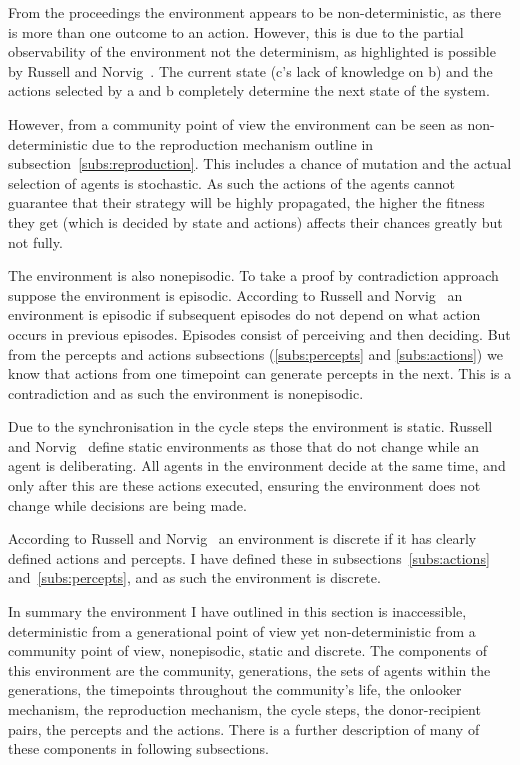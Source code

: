 \documentclass[]{final_report}
\begin{document}
From the proceedings the environment appears to be non-deterministic, as there is more than one outcome to an action. However, this is due to the partial observability of the environment not the determinism, as highlighted is possible by Russell and Norvig~\cite{russell2016artificial}. The current state (c's lack of knowledge on b) and the actions selected by a and b completely determine the next state of the system.\par
However, from a community point of view the environment can be seen as non-deterministic due to the reproduction mechanism outline in subsection~\ref{subs:reproduction}. This includes a chance of mutation and the actual selection of agents is stochastic. As such the actions of the agents cannot guarantee that their strategy will be highly propagated, the higher the fitness they get (which is decided by state and actions) affects their chances greatly but not fully.\par
The environment is also nonepisodic. To take a proof by contradiction approach suppose the environment is episodic. According to Russell and Norvig~\cite{russell2016artificial} an environment is episodic if subsequent episodes do not depend on what action occurs in previous episodes. Episodes consist of perceiving and then deciding. But from the percepts and actions subsections (\ref{subs:percepts} and \ref{subs:actions}) we know that actions from one timepoint can generate percepts in the next. This is a contradiction and as such the environment is nonepisodic.\par
Due to the synchronisation in the cycle steps the environment is static. Russell and Norvig~\cite{russell2016artificial} define static environments as those that do not change while an agent is deliberating. All agents in the environment decide at the same time, and only after this are these actions executed, ensuring the environment does not change while decisions are being made.\par
According to Russell and Norvig~\cite{russell2016artificial} an environment is discrete if it has clearly defined actions and percepts. I have defined these in subsections~\ref{subs:actions} and~\ref{subs:percepts}, and as such the environment is discrete.\par
In summary the environment I have outlined in this section is inaccessible, deterministic from a generational point of view yet non-deterministic from a community point of view, nonepisodic, static and discrete. The components of this environment are the community, generations, the sets of agents within the generations, the timepoints throughout the community's life, the onlooker mechanism, the reproduction mechanism, the cycle steps, the donor-recipient pairs, the percepts and the actions. There is a further description of many of these components in following subsections.
\end{document}
